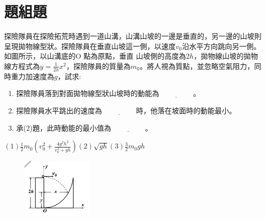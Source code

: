 \documentclass[cn,10pt,math=newtx,chinesefont=founder,device=ig]{elegantbook}
\begin{document}
\section{題組題}


\begin{example}
   探險隊員在探險拓荒時遇到一道山溝，山溝山坡的一邊是垂直的，另一邊的山坡則呈現拋物線型狀。探險隊員在垂直山坡這一側，以速度$v_0$沿水平方向跳向另一側。如圖所示，以山溝底的O 點為原點，垂直
山坡側的高度為2$h$，拋物線山坡的拋物線方程式為$y=\frac{1}{2h}x^2$，探險隊員的質量為$m_0$。將人視為質點，並忽略空氣阻力，同時重力加速度為$g$，試求:
\begin{enumerate}[label=(\arabic*)] 
  \item 探險隊員落到對面拋物線型狀山坡時的動能為$\underline{\hspace{2cm}}$。
  \item 探險隊員水平跳出的速度為$\underline{\hspace{2cm}}$時，他落在坡面時的動能最小。
  \item 承(2)題，此時動能的最小值為$\underline{\hspace{2cm}}$。
    \end{enumerate}
    \rightline{[復興高中教甄109]}
\end{example}
\begin{solution}
    $(1) \frac{1}{2} m_0(v^2_0+\frac{4g^2 h^2}{v^2_0+gh})  (2) \sqrt{gh}  (3) \frac{3}{2} m_0 gh$
\end{solution}
\begin{figure}[htbp]
    \flushright
    \includegraphics[width=0.3\textwidth]{image/109復興11.png}
  \end{figure}
\newpage
\end{document}
